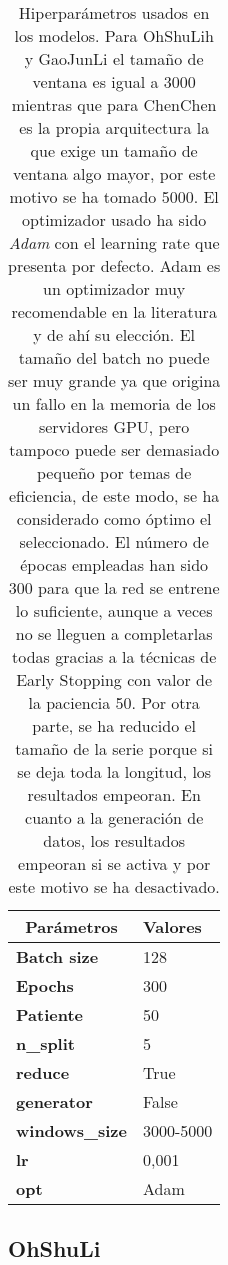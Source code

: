     
    \begin{table}[H]
        \caption{Hiperparámetros usados en los modelos. Para OhShuLih y GaoJunLi el tamaño de ventana es igual a 3000 mientras que para ChenChen es la propia arquitectura la que exige un tamaño de ventana algo mayor, por este motivo se ha tomado 5000. El optimizador usado ha sido \textit{Adam} con el learning rate que presenta por defecto. Adam es un optimizador muy recomendable en la literatura y de ahí su elección. El tamaño del batch no puede ser muy grande ya que origina un fallo en la memoria de los servidores GPU, pero tampoco puede ser demasiado pequeño por temas de eficiencia, de este modo, se ha considerado como óptimo el seleccionado. El número de épocas empleadas han sido 300 para que la red se entrene lo suficiente, aunque a veces no se lleguen a completarlas todas gracias a la técnicas de Early Stopping con valor de la paciencia 50. Por otra parte, se ha reducido el tamaño de la serie porque si se deja toda la longitud, los resultados empeoran. En cuanto a la generación de datos, los resultados empeoran si se activa y por este motivo se ha desactivado. }
        \begin{center}
        \begin{tabular}{|l|l|}
        \hline
        \multicolumn{1}{|c|}{\textbf{Parámetros}} & \multicolumn{1}{l|}{Valores} \\ \hline
        \textbf{Batch size} & 128 \\ \hline
        \textbf{Epochs} & 300 \\ \hline
        \textbf{Patiente} & 50 \\ \hline
        \textbf{n\_split} & 5 \\ \hline
        \textbf{reduce} & True \\ \hline
        \textbf{generator} & False \\ \hline
        \textbf{windows\_size} & 3000-5000 \\ \hline
        \textbf{lr} & 0,001 \\ \hline
        \textbf{opt} & Adam \\ \hline
        \end{tabular}
        \end{center}
        \label{fig:hiper_lit}
    \end{table}
    
    \subsection{OhShuLi}
    
